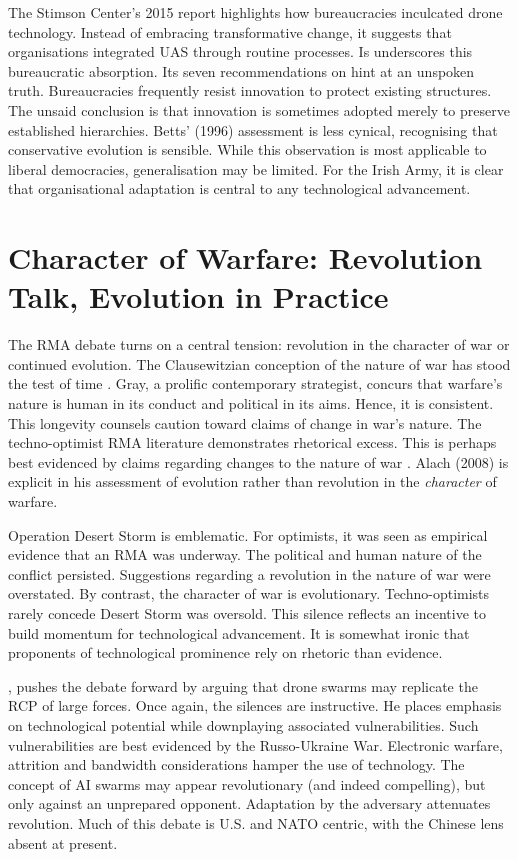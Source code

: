 The Stimson Center's 2015 report highlights how bureaucracies inculcated drone technology. Instead of embracing transformative change, it suggests that organisations integrated UAS through routine processes. Is underscores this bureaucratic absorption. Its seven recommendations on \parencite[p.~9]{STIMSON_2015} hint at an unspoken truth. Bureaucracies frequently resist innovation to protect existing structures. The unsaid conclusion is that innovation is sometimes adopted merely to preserve established hierarchies. Betts' (1996) assessment is less cynical, recognising that conservative evolution is sensible. While this observation is most applicable to liberal democracies, generalisation may be limited. For the Irish Army, it is clear that organisational adaptation is central to any technological advancement.


\section{Character of Warfare: Revolution Talk, Evolution in Practice}
The RMA debate turns on a central tension: revolution in the character of war or continued evolution. The Clausewitzian conception of the nature of war has stood the test of time \parencite{CLAUSEWITZ_1984}. Gray, a prolific contemporary strategist, concurs that warfare's nature is human in its conduct and political in its aims\parencite{GRAY_2018}. Hence, it is consistent. This longevity counsels caution toward claims of change in war's nature. The techno-optimist RMA literature demonstrates rhetorical excess. This is perhaps best evidenced by claims regarding changes to the nature of war \textcite{HUNDLEY_1999,KREPINEVICH_1992,JORD_2003}. Alach (2008) is explicit in his assessment of evolution rather than revolution in the \textit{character} of warfare.

Operation Desert Storm is emblematic. For optimists, it was seen as empirical evidence that an RMA was underway. The political and human nature of the conflict persisted. Suggestions regarding a revolution in the nature of war were overstated. By contrast, the character of war is evolutionary. Techno-optimists rarely concede Desert Storm was oversold. This silence reflects an incentive to build momentum for technological advancement. It is somewhat ironic that proponents of technological prominence rely on rhetoric than evidence. 

\parencite{HUSAIN_2021}, pushes the debate forward by arguing that drone swarms may replicate the RCP of large forces. Once again, the silences are instructive. He places emphasis on technological potential while downplaying associated vulnerabilities. Such vulnerabilities are best evidenced by the Russo-Ukraine War. Electronic warfare, attrition and bandwidth considerations hamper the use of technology. The concept of AI swarms may appear revolutionary (and indeed compelling), but only against an unprepared opponent. Adaptation by the adversary attenuates revolution. Much of this debate is U.S. and NATO centric, with the Chinese lens absent at present.


